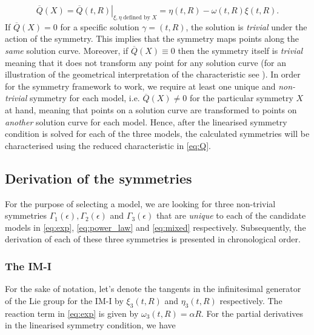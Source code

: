 \begin{equation}
\overline{Q}(X)=\left.\overline{Q}(t,R)\right|_{\xi,\eta\;\textrm{defined by}\;X}=\eta(t,R)-\omega(t,R)\xi(t,R).
\label{eq:Q}
\end{equation}
If $\overline{Q}(X)=0$ for a specific solution $\gamma=(t,R)$, the solution is \textit{trivial} under the action of the symmetry. This implies that the symmetry maps points along the \textit{same} solution curve. Moreover, if $\overline{Q}(X)\equiv 0$ then the symmetry itself is \textit{trivial} meaning that it does not transform any point for any solution curve (for an illustration of the geometrical interpretation of the characteristic see \cite{borgqvist2020phdthesis}). In order for the symmetry framework to work, we require at least one unique and \textit{non-trivial} symmetry for each model, i.e. $\overline{Q}(X)\neq 0$ for the particular symmetry $X$ at hand, meaning that points on a solution curve are transformed to points on \textit{another} solution curve for each model. Hence, after the linearised symmetry condition is solved for each of the three models, the calculated symmetries will be characterised using the reduced characteristic in \eqref{eq:Q}. 


\subsection{Derivation of the symmetries}
For the purpose of selecting a model, we are looking for three non-trivial symmetries $\Gamma_1(\epsilon),\Gamma_2(\epsilon)$ and $\Gamma_3(\epsilon)$ that are \textit{unique} to each of the candidate models in \eqref{eq:exp}, \eqref{eq:power_law} and \eqref{eq:mixed} respectively. Subsequently, the derivation of each of these three symmetries is presented in chronological order. 
\subsubsection{The IM-I}
For the sake of notation, let's denote the tangents in the infinitesimal generator of the Lie group for the IM-I by $\xi_3(t,R)$ and $\eta_3(t,R)$ respectively. The reaction term in \eqref{eq:exp} is given by $\omega_3(t,R)=\alpha R$. For the partial derivatives in the linearised symmetry condition, we have

